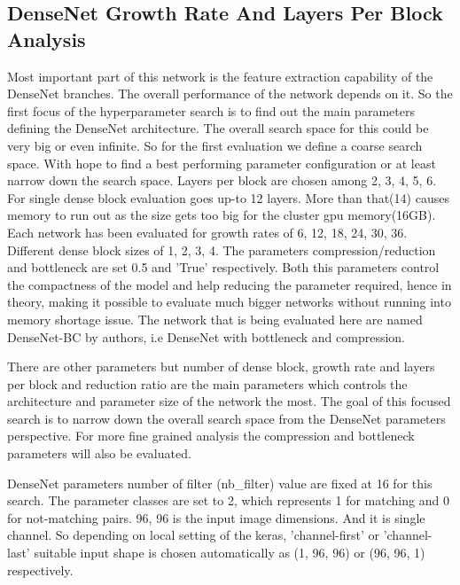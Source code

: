 \subsection{DenseNet Growth Rate And Layers Per Block Analysis}
 Most important part of this network is the feature extraction capability of the DenseNet branches. The overall performance of the network depends on it. So the first focus of the hyperparameter search is to find out the 
 main parameters defining the DenseNet architecture. The overall search space for this could be very big or even infinite. So for the first evaluation we define a coarse search space. With hope to find a best performing 
 parameter configuration or at least narrow down the search space.
 Layers per block are chosen among 2, 3, 4, 5, 6. For single dense block evaluation goes up-to 12 layers. More than that(14) causes memory to run out as the size gets too big 
 for the cluster gpu memory(16GB). Each network has been evaluated for growth rates of 6, 12, 18, 24, 30, 36. Different dense block sizes of 1, 2, 3, 4. The parameters compression/reduction and bottleneck are set 0.5 and 'True' respectively.
 Both this parameters control the compactness of the model and help reducing the parameter required, hence in theory, making it possible to evaluate much bigger networks without running into memory shortage issue. 
 The network that is being evaluated here are named DenseNet-BC by authors, i.e DenseNet with bottleneck and compression. 
 
 There are other parameters but number of dense block, growth rate and layers per block and reduction ratio are the main parameters which controls the architecture and parameter size of the network the most.
 The goal of this focused search is to narrow down the overall search space from the DenseNet parameters perspective. For more fine grained analysis the compression and bottleneck parameters will also be evaluated. 
 
 DenseNet parameters number of filter (nb\_filter) value are fixed at 16 for this search. The parameter classes are set to 2, which represents 1 for matching and 0 for not-matching pairs. 96, 96 is the input image dimensions. 
 And it is single channel. So depending on local setting of the keras, 'channel-first' or 'channel-last' suitable input shape is chosen automatically as (1, 96, 96) or (96, 96, 1) respectively.
 
